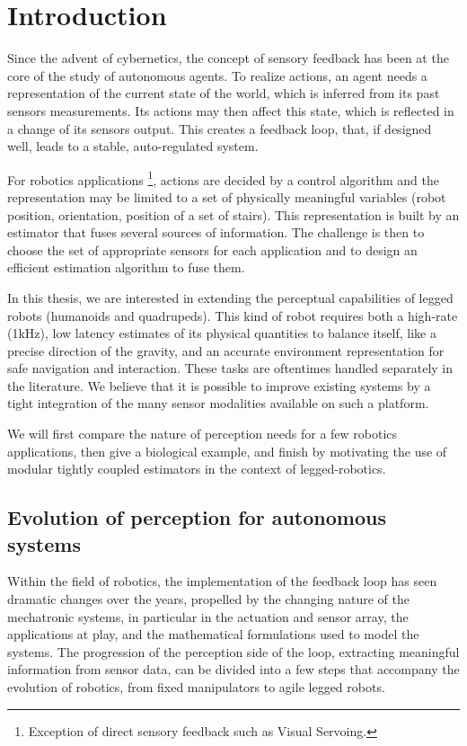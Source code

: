 \chapter{Introduction}



Since the advent of cybernetics, the concept of sensory feedback has been at the core of the study of autonomous agents. To realize
actions, an agent needs a representation of the current state of the world, which is inferred from its past sensors measurements. Its actions may 
then affect this state, which is reflected in a change of its sensors output. This creates a feedback loop, that, if designed well, leads to a stable, 
auto-regulated system.

For robotics applications \footnote{Exception of direct sensory feedback such as Visual Servoing.}, actions are decided by a control algorithm and 
the representation may be limited to a set of physically meaningful variables (robot position, orientation, position of a set of stairs). 
This representation is built by an estimator that fuses several sources of information. 
The challenge is then to choose the set of appropriate sensors for each application and to design an efficient estimation algorithm to fuse them.

In this thesis, we are interested in extending the perceptual capabilities of legged robots (humanoids and quadrupeds). This kind of robot requires both a high-rate (1kHz),
low latency estimates of its physical quantities to balance itself, like a precise direction of the gravity, and an accurate environment representation for safe navigation and interaction.
These tasks are oftentimes handled separately in the literature. We believe that it is possible to improve existing systems by a tight integration of the
many sensor modalities available on such a platform.

We will first compare the nature of perception needs for a few robotics applications, then give a biological example, and finish by motivating the use of 
modular tightly coupled estimators in the context of legged-robotics.



\section{Evolution of perception for autonomous systems}

Within the field of robotics, the implementation of the feedback loop has seen dramatic changes over the years, propelled by the changing nature 
of the mechatronic systems, in particular in the actuation and sensor array, the applications at play, and the mathematical formulations
used to model the systems. The progression of the perception side of the loop, extracting meaningful information from sensor data, can be divided into a few
steps that accompany the evolution of robotics, from fixed manipulators to agile legged robots. 

